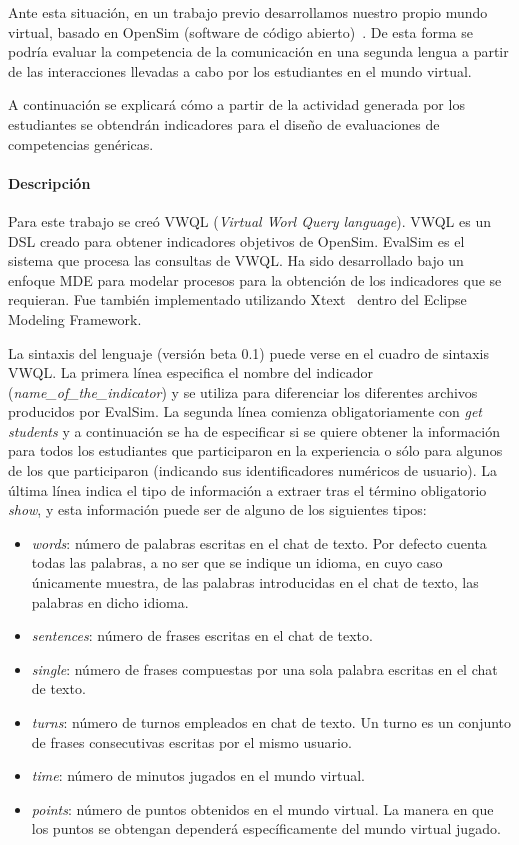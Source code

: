		Ante esta situación, en un trabajo previo desarrollamos nuestro propio mundo virtual, basado en OpenSim (software de código abierto)~\cite{berns2013using}. De esta forma se podría evaluar la competencia de la comunicación en una segunda lengua a partir de las interacciones llevadas a cabo por los estudiantes en el mundo virtual.

		A continuación se explicará cómo a partir de la actividad generada por los estudiantes se obtendrán indicadores para el diseño de evaluaciones de competencias genéricas.

			\paragraph{Descripción}

			Para este trabajo se creó VWQL (\emph{Virtual Worl Query language}). VWQL es un DSL creado para obtener indicadores objetivos de OpenSim. EvalSim es el sistema que procesa las consultas de VWQL. Ha sido desarrollado bajo un enfoque MDE para modelar procesos para la obtención de los indicadores que se requieran. Fue también implementado utilizando Xtext~\cite{eysholdt2010xtext} dentro del Eclipse Modeling Framework.

			La sintaxis del lenguaje (versión beta 0.1) puede verse en el cuadro de sintaxis VWQL. La primera línea especifica el nombre del indicador (\emph{name\_of\_the\_indicator}) y se utiliza para diferenciar los diferentes archivos producidos por EvalSim. La segunda línea comienza obligatoriamente con \emph{get students} y a continuación se ha de especificar si se quiere obtener la información para todos los estudiantes que participaron en la experiencia o sólo para algunos de los que participaron (indicando sus identificadores numéricos de usuario). La última línea indica el tipo de información a extraer tras el término obligatorio \emph{show}, y esta información puede ser de alguno de los siguientes tipos:

\begin{itemize}
\item \emph{words}: número de palabras escritas en el chat de texto. Por defecto cuenta todas las palabras, a no ser que se indique un idioma, en cuyo caso únicamente muestra, de las palabras introducidas en el chat de texto, las palabras en dicho idioma.
\item \emph{sentences}: número de frases escritas en el chat de texto.
\item \emph{single}: número de frases compuestas por una sola palabra escritas en el chat de texto.
\item \emph{turns}: número de turnos empleados en chat de texto. Un turno es un conjunto de frases consecutivas escritas por el mismo usuario.
\item \emph{time}: número de minutos jugados en el mundo virtual.
\item \emph{points}: número de puntos obtenidos en el mundo virtual. La manera en que los puntos se obtengan dependerá específicamente del mundo virtual jugado.
\end{itemize}

